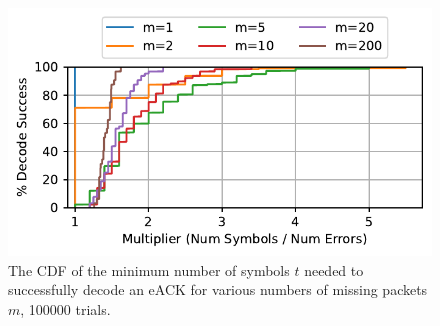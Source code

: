 \begin{figure}[t]
    \centering
    \includegraphics[width=0.9\linewidth]{packrat-paper/figures/quack_multiplier.pdf}
    \caption{The CDF of the minimum number of symbols $t$ needed to successfully
    decode an eACK for various numbers of missing packets $m$, 100000 trials.}
    \label{fig:iblt-quack}
\end{figure}